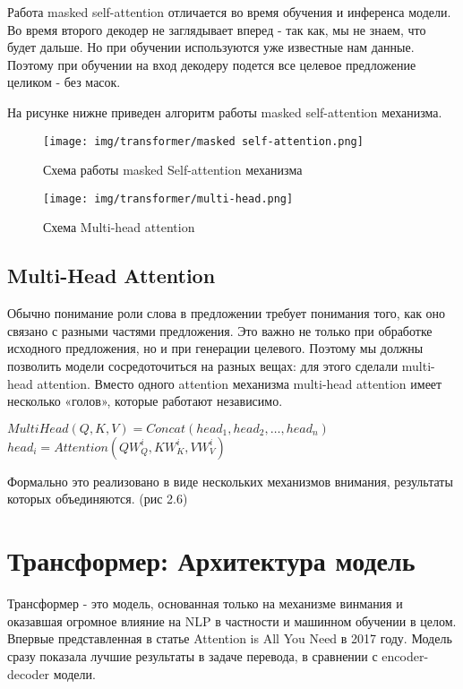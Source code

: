\documentclass[PMI,VKR]{HSEUniversity}
\begin{document}
Работа masked self-attention отличается во время обучения и инференса модели. Во время второго декодер не заглядывает вперед - так как, мы не знаем, что будет дальше. Но при обучении используются уже известные нам данные. Поэтому при обучении на вход декодеру подется все целевое предложение целиком - без масок.

На рисунке нижне приведен алгоритм работы masked self-attention механизма.

\begin{figure}[h]
    \centering
    \texttt{[image: img/transformer/masked self-attention.png]}
    \caption{Схема работы masked Self-attention механизма}
\end{figure}

\begin{figure}[h]
    \centering
    \texttt{[image: img/transformer/multi-head.png]}
    \caption{Схема Multi-head attention}
\end{figure}

\subsection{Multi-Head Attention}

Обычно понимание роли слова в предложении требует понимания того, как оно связано с разными частями предложения. Это важно не только при обработке исходного предложения, но и при генерации целевого. 
Поэтому мы должны позволить модели сосредоточиться на разных вещах: для этого сделали multi-head attention. Вместо одного attention механизма multi-head attention имеет несколько «голов», которые работают независимо.

\begin{center}
$MultiHead(Q, K, V) = Concat(head_{1}, head_{2}, \dots, head_{n})$ \\
$head_{i} = Attention(QW^{i}_{Q}, KW^{i}_{K}, VW^{i}_{V})$
\end{center}

Формально это реализовано в виде нескольких механизмов внимания, результаты которых объединяются. (рис 2.6)

\newpage
\section{Трансформер: Архитектура модель}

Трансформер - это модель, основанная только на механизме винмания и оказавшая огромное влияние на NLP в частности и машинном обучении в целом. Впервые представленная в статье Attention is All You Need\cite{allyouneed:2017} в 2017 году. 
Модель сразу показала лучшие результаты в задаче перевода, в сравнении с encoder-decoder модели. 
\end{document}
